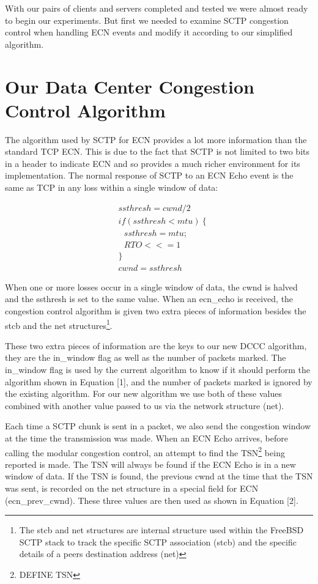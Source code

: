 \documentclass[12pt]{article}
\begin{document}
With our pairs of clients and servers completed and tested we were almost ready to 
begin our experiments. But first we needed to examine SCTP congestion control
when handling ECN events and modify it according to our simplified algorithm.

\section{Our Data Center Congestion Control Algorithm}
\label{algo}
The algorithm used by SCTP for ECN provides a lot more information than
the standard TCP ECN. This is due to the fact that SCTP is not limited to two bits
in a header to indicate ECN and so provides a much richer environment for its
implementation. The normal response of SCTP to an ECN Echo event is the same
as TCP in any loss within a single window of data:

\begin{equation}
\begin{split}
&ssthresh = cwnd / 2\\
&if (ssthresh < mtu)~\{ \\
&~~~ssthresh = mtu; \\
&~~~RTO <<= 1\\
&\} \\
&cwnd = ssthresh
\end{split}
\label{algo1}
\end{equation}

When one or more losses occur in a single window of data, the cwnd is halved and
the ssthresh is set to the same value. When an ecn\_echo is received, the congestion
control algorithm is given two extra pieces of information besides the stcb and the 
net structures\footnote{The stcb and net structures are internal structure used within the FreeBSD SCTP
stack to track the specific SCTP association (stcb) and the specific details of a peers destination
address (net)}.

These two extra pieces of information are the keys to our new DCCC algorithm, they are
the in\_window flag as well as the number of packets marked. The in\_window flag
is used by the current algorithm to know if it should perform the
algorithm shown in Equation [1],  and
the number of packets marked is ignored by the existing algorithm. For
our new algorithm we use both of these values combined with another value passed
to us via the network structure (net).

Each time a SCTP chunk is sent in a packet, we also send the congestion
window at the time the transmission was made. When an ECN Echo arrives, before calling
the modular congestion control, an attempt to find the
TSN\footnote{DEFINE TSN}  being reported is made. The TSN
will always be found if the ECN Echo is in a new window of data. If the TSN
is found, the previous cwnd at the time that the TSN was sent, is recorded on
the net structure in a special field for ECN (ecn\_prev\_cwnd).  These three values are then used as shown in Equation [2].
\end{document}
